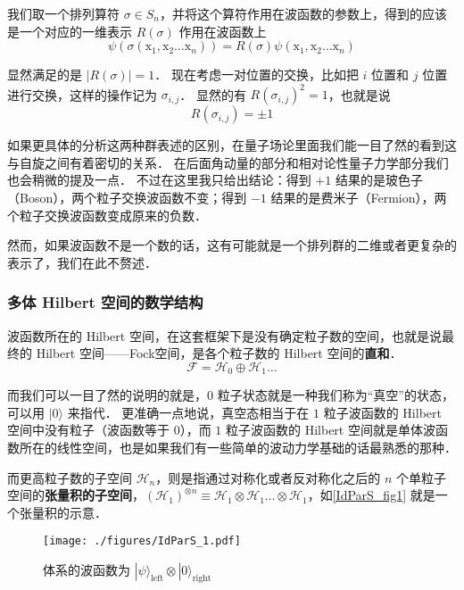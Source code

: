 我们取一个排列算符 $\sigma\in S_n$，并将这个算符作用在波函数的参数上，得到的应该是一个对应的一维表示 $R(\sigma)$ 作用在波函数上
\begin{equation}
\psi(\sigma ({\mathrm x}_1, {\mathrm x}_2\dots{\mathrm x}_n)) = R(\sigma)\psi({\mathrm x}_1, {\mathrm x}_2\dots{\mathrm x}_n)
\end{equation}

显然满足的是 $|R(\sigma)| = 1$． 现在考虑一对位置的交换，比如把 $i$ 位置和 $j$ 位置进行交换，这样的操作记为 $\sigma_{i,j}$． 显然的有 $R(\sigma_{i,j})^2 = 1$，也就是说
\begin{equation}
R(\sigma_{i,j}) = \pm 1
\end{equation}

如果更具体的分析这两种群表述的区别，在量子场论里面我们能一目了然的看到这与自旋之间有着密切的关系． 在后面角动量的部分和相对论性量子力学部分我们也会稍微的提及一点． 不过在这里我只给出结论：得到 $+1$ 结果的是玻色子（Boson），两个粒子交换波函数不变；得到 $-1$ 结果的是费米子（Fermion），两个粒子交换波函数变成原来的负数．

然而，如果波函数不是一个数的话，这有可能就是一个排列群的二维或者更复杂的表示了，我们在此不赘述．

\subsubsection{多体 Hilbert 空间的数学结构}

波函数所在的 Hilbert 空间，在这套框架下是没有确定粒子数的空间，也就是说最终的 Hilbert 空间——Fock空间，是各个粒子数的 Hilbert 空间的\textbf{直和}．
\begin{equation}
\mathcal{F} = \mathcal{H}_0 \oplus \mathcal{H}_1\dots
\end{equation}

而我们可以一目了然的说明的就是，$0$ 粒子状态就是一种我们称为“真空”的状态，可以用 $|0\rangle$ 来指代． 更准确一点地说，真空态相当于在 $1$ 粒子波函数的 Hilbert 空间中没有粒子（波函数等于 $0$），而 $1$ 粒子波函数的 Hilbert 空间就是单体波函数所在的线性空间，也是如果我们有一些简单的波动力学基础的话最熟悉的那种．

而更高粒子数的子空间 $\mathcal{H}_n$，则是指通过对称化或者反对称化之后的 $n$ 个单粒子空间的\textbf{张量积的子空间}，$(\mathcal{H}_1)^{\otimes n} \equiv \mathcal{H}_1\otimes \mathcal{H}_1\dots\otimes\mathcal{H}_1$，如\autoref{IdParS_fig1} 就是一个张量积的示意．

\begin{figure}[ht]
\centering
\texttt{[image: ./figures/IdParS\_1.pdf]}
\caption{体系的波函数为 $|\psi\rangle_\text{left}\otimes|0\rangle_\text{right}$} \label{IdParS_fig1}
\end{figure}

